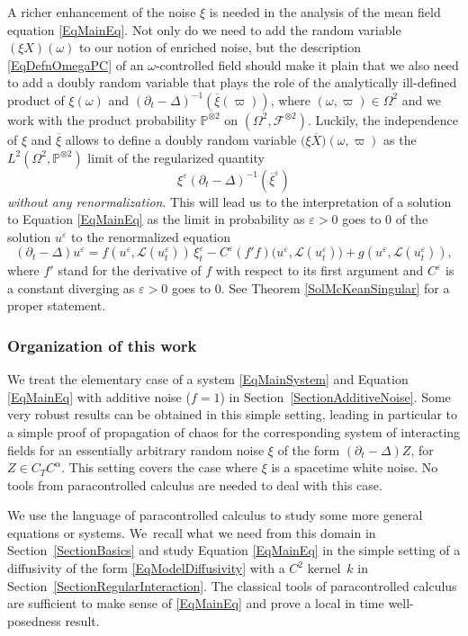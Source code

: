 \documentclass[10pt]{amsart}
\theoremstyle{definition}
\let\epsilon\varepsilon
\newcommand{\mcF}{\mathcal{F}}
\newcommand{\mcL}{\mathcal{L}}
\begin{document}
A richer enhancement of the noise $\xi$ is needed in the analysis of the mean field equation \eqref{EqMainEq}. Not only do we need to add the random variable $(\xi X)(\omega)$ to our notion of enriched noise, but the description \eqref{EqDefnOmegaPC} of an $\omega$\nobreakdash-controlled field should make it plain that we also need to add a doubly random variable that plays the role of the analytically ill-defined product of $\xi(\omega)$ and $(\partial_t-\Delta)^{-1}(\overline{\xi}(\varpi))$, where $(\omega,\varpi)\in\Omega^2$ and we work with the product probability $\mathbb{P}^{\otimes 2}$ on $(\Omega^2,\mcF^{\otimes 2})$. Luckily, the independence of $\xi$ and $\overline{\xi}$ allows to define a doubly random variable $\bigl(\xi \overline{X})(\omega,\varpi)$ as the $L^2(\Omega^2,\mathbb{P}^{\otimes 2})$ limit of the regularized quantity
\[
\xi^\epsilon(\partial_t-\Delta)^{-1}(\overline{\xi}^\epsilon)
\]
{\it without any renormalization}. This will lead us to the interpretation of a solution to Equation \eqref{EqMainEq} as the limit in probability as $\epsilon>0$ goes to $0$ of the solution $u^\epsilon$ to the renormalized equation
\[
(\partial_t-\Delta)u^\epsilon = f(u^\epsilon,\mcL(u^\epsilon_t))\,\xi^\epsilon_t - C^\epsilon (f'f)\bigl(u^\epsilon,\mcL(u^\epsilon_t)\bigr) + g(u^\epsilon,\mcL(u^\epsilon_t)),
\]
where $f'$ stand for the derivative of $f$ with respect to its first argument and $C^\epsilon$ is a constant diverging as $\epsilon>0$ goes to $0$. See Theorem \ref{SolMcKeanSingular} for a proper statement.

\subsubsection*{Organization of this work} We treat the elementary case of a system \eqref{EqMainSystem} and Equation \eqref{EqMainEq} with additive noise ($f=1$) in Section~\ref{SectionAdditiveNoise}. Some very robust results can be obtained in this simple setting, leading in particular to a simple proof of propagation of chaos for the corresponding system of interacting fields for an essentially arbitrary random noise $\xi$ of the form $(\partial_t-\Delta)Z$, for $Z\in C_TC^\alpha$. This setting covers the case where $\xi$ is a spacetime white noise. No tools from paracontrolled calculus are needed to deal with this case.

We use the language of paracontrolled calculus to study some more general equations or systems. We~recall what we need from this domain in Section~\ref{SectionBasics} and study Equation \eqref{EqMainEq} in the simple setting of a diffusivity of the form \eqref{EqModelDiffusivity} with a $C^2$ kernel~$k$ in Section~\ref{SectionRegularInteraction}. The classical tools of paracontrolled calculus are sufficient to make sense of \eqref{EqMainEq} and prove a local in time well-posedness result.
\end{document}
